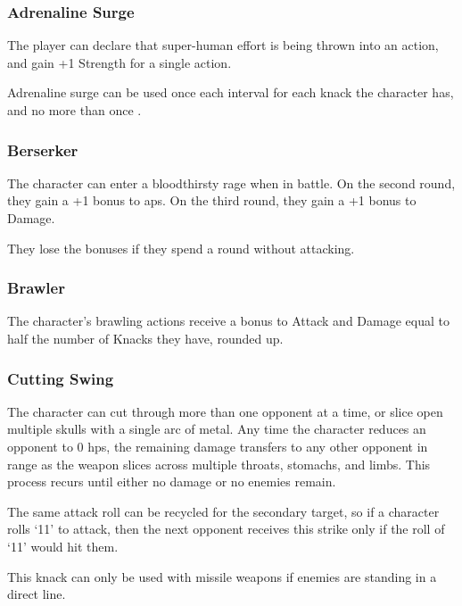 \begin{multicols}{2}

\subsubsection{Adrenaline Surge}
\label{adrenalinesurge}

The player can declare that super-human effort is being thrown into an action, and gain +1 Strength for a single action.

Adrenaline surge can be used once each \gls{interval} for each knack the character has, and no more than once .

\subsubsection{Berserker}

The character can enter a bloodthirsty rage when in battle.
On the second round, they gain a +1 bonus to \glspl{ap}.
On the third round, they gain a +1 bonus to Damage.

They lose the bonuses if they spend a round without attacking.

\subsubsection{Brawler}

The character's brawling actions receive a bonus to Attack and Damage equal to half the number of Knacks they have, rounded up.

\subsubsection{Cutting Swing}

The character can cut through more than one opponent at a time, or slice open multiple skulls with a single arc of metal.
Any time the character reduces an opponent to 0 \glspl{hp}, the remaining damage transfers to any other opponent in range as the weapon slices across multiple throats, stomachs, and limbs.
This process recurs until either no damage or no enemies remain.

The same attack roll can be recycled for the secondary target, so if a character rolls `11' to attack, then the next opponent receives this strike only if the roll of `11' would hit them.

This knack can only be used with missile weapons if enemies are standing in a direct line.


\end{multicols}
